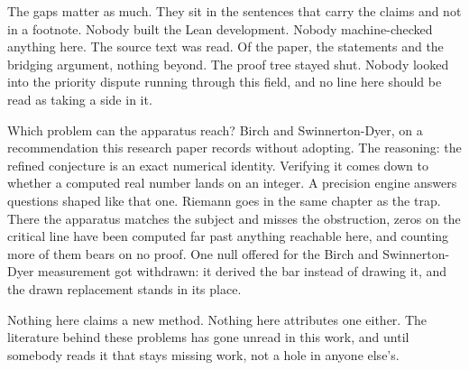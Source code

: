 The gaps matter as much. They sit in the sentences that carry the claims and not in a footnote.
Nobody built the Lean development. Nobody machine-checked anything here. The source text was
read. Of the paper, the statements and the bridging argument, nothing beyond. The proof tree stayed
shut. Nobody looked into the priority dispute running through this field, and no line here should be
read as taking a side in it.

Which problem can the apparatus reach? Birch and Swinnerton-Dyer, on a
recommendation this research paper records without adopting. The reasoning: the refined conjecture is
an exact numerical identity. Verifying it comes down to whether a computed real number lands on
an integer. A precision engine answers questions shaped like that one. Riemann goes in the same
chapter as the trap. There the apparatus matches the subject and misses the obstruction, zeros on
the critical line have been computed far past anything reachable here, and counting more of them
bears on no proof. One null offered for the Birch and Swinnerton-Dyer measurement got withdrawn: it
derived the bar instead of drawing it, and the drawn replacement stands in its
place.

Nothing here claims a new method. Nothing here attributes one either. The literature behind these
problems has gone unread in this work, and until somebody reads it that stays missing work, not a
hole in anyone else's.
\cleardoublepage
